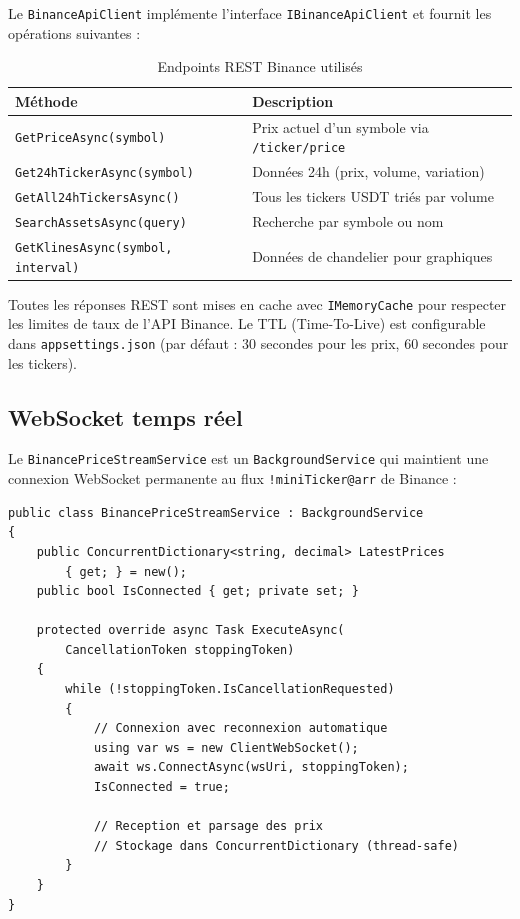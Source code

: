 \documentclass[12pt,a4paper]{article}
\begin{document}
Le \texttt{BinanceApiClient} implémente l'interface \texttt{IBinanceApiClient} et fournit les opérations suivantes :

\begin{table}[H]
\centering
\caption{Endpoints REST Binance utilisés}
\begin{tabularx}{\textwidth}{lX}
    \toprule
    \textbf{Méthode} & \textbf{Description} \\
    \midrule
    \texttt{GetPriceAsync(symbol)} & Prix actuel d'un symbole via \texttt{/ticker/price} \\
    \texttt{Get24hTickerAsync(symbol)} & Données 24h (prix, volume, variation) \\
    \texttt{GetAll24hTickersAsync()} & Tous les tickers USDT triés par volume \\
    \texttt{SearchAssetsAsync(query)} & Recherche par symbole ou nom \\
    \texttt{GetKlinesAsync(symbol, interval)} & Données de chandelier pour graphiques \\
    \bottomrule
\end{tabularx}
\end{table}

\begin{infobox}
Toutes les réponses REST sont mises en cache avec \texttt{IMemoryCache} pour respecter les limites de taux de l'API Binance. Le TTL (Time-To-Live) est configurable dans \texttt{appsettings.json} (par défaut : 30 secondes pour les prix, 60 secondes pour les tickers).
\end{infobox}

\subsection{WebSocket temps réel}

Le \texttt{BinancePriceStreamService} est un \texttt{BackgroundService} qui maintient une connexion WebSocket permanente au flux \texttt{!miniTicker@arr} de Binance :

\begin{lstlisting}[caption={Service WebSocket --- Prix en temps réel}]
public class BinancePriceStreamService : BackgroundService
{
    public ConcurrentDictionary<string, decimal> LatestPrices
        { get; } = new();
    public bool IsConnected { get; private set; }

    protected override async Task ExecuteAsync(
        CancellationToken stoppingToken)
    {
        while (!stoppingToken.IsCancellationRequested)
        {
            // Connexion avec reconnexion automatique
            using var ws = new ClientWebSocket();
            await ws.ConnectAsync(wsUri, stoppingToken);
            IsConnected = true;

            // Reception et parsage des prix
            // Stockage dans ConcurrentDictionary (thread-safe)
        }
    }
}
\end{lstlisting}
\end{document}
